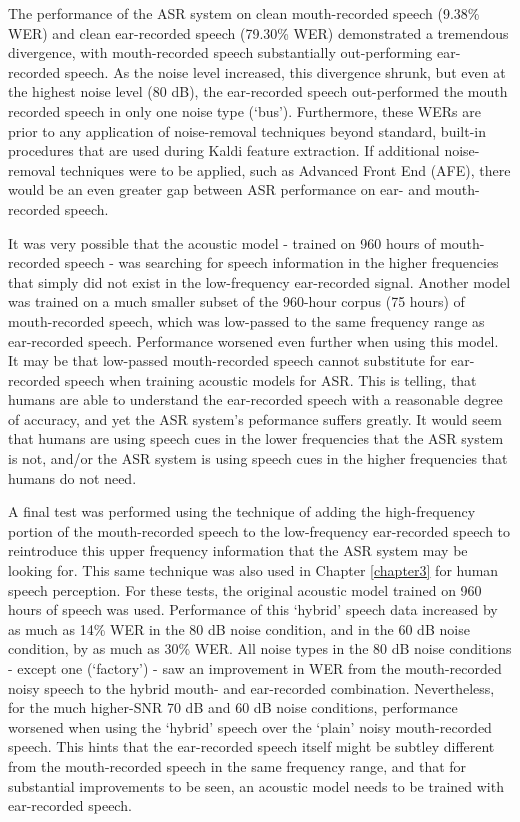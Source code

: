 The performance of the ASR system on clean mouth-recorded speech (9.38\% WER) and clean ear-recorded speech (79.30\% WER) demonstrated a tremendous divergence, with mouth-recorded speech substantially out-performing ear-recorded speech.  As the noise level increased, this divergence shrunk, but even at the highest noise level (80 dB), the ear-recorded speech out-performed the mouth recorded speech in only one noise type (`bus').  Furthermore, these WERs are prior to any application of noise-removal techniques beyond standard, built-in procedures that are used during Kaldi feature extraction.  If additional noise-removal techniques were to be applied, such as Advanced Front End (AFE), there would be an even greater gap between ASR performance on ear- and mouth-recorded speech.

It was very possible that the acoustic model - trained on 960 hours of mouth-recorded speech - was searching for speech information in the higher frequencies that simply did not exist in the low-frequency ear-recorded signal.  Another model was trained on a much smaller subset of the 960-hour corpus (75 hours) of mouth-recorded speech, which was low-passed to the same frequency range as ear-recorded speech.  Performance worsened even further when using this model.  It may be that low-passed mouth-recorded speech cannot substitute for ear-recorded speech when training acoustic models for ASR.  This is telling, that humans are able to understand the ear-recorded speech with a reasonable degree of accuracy, and yet the ASR system's peformance suffers greatly.  It would seem that humans are using speech cues in the lower frequencies that the ASR system is not, and/or the ASR system is using speech cues in the higher frequencies that humans do not need.

A final test was performed using the technique of adding the high-frequency portion of the mouth-recorded speech to the low-frequency ear-recorded speech to reintroduce this upper frequency information that the ASR system may be looking for.  This same technique was also used in Chapter \ref{chapter3} for human speech perception.  For these tests, the original acoustic model trained on 960 hours of speech was used. Performance of this `hybrid' speech data increased by as much as 14\% WER in the 80 dB noise condition, and in the 60 dB noise condition, by as much as 30\% WER.  All noise types in the 80 dB noise conditions - except one (`factory') - saw an improvement in WER from the mouth-recorded noisy speech to the hybrid mouth- and ear-recorded combination.  Nevertheless, for the much higher-SNR 70 dB and 60 dB noise conditions, performance worsened when using the `hybrid' speech over the `plain' noisy mouth-recorded speech.  This hints that the ear-recorded speech itself might be subtley different from the mouth-recorded speech in the same frequency range, and that for substantial improvements to be seen, an acoustic model needs to be trained with ear-recorded speech.

